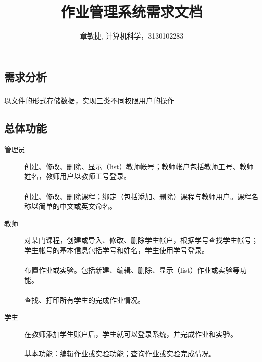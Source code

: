 \documentclass[notitlepage,cs4size,punct,oneside]{report}
\begin{document}
\begin{CJK}{UTF8}{hei} %


\renewcommand{\abstractname}{摘 \qquad 要}
\renewcommand{\contentsname}{\center 目\qquad\qquad 录}
\renewcommand{\listfigurename}{图 \quad 示 \quad 目 \quad 录}
\renewcommand{\listtablename}{表 \quad 格 \quad 目 \quad 录}
\renewcommand{\appendixname}{附录}
\renewcommand{\chaptername}{章节}
\renewcommand{\indexname}{\center 索 \qquad 引}
\renewcommand{\figurename}{图}
\renewcommand{\tablename}{表}

\newcommand{\upcite}[1]{\textsuperscript{\cite{#1}}}


\title{作业管理系统需求文档}
\author{章敏捷, 计算机科学，3130102283}

\maketitle
\tableofcontents
\pagebreak

\chapter{需求分析}
\paragraph{}以文件的形式存储数据，实现三类不同权限用户的操作
\section{总体功能}
\begin{description}
  \item[管理员] 创建、修改、删除、显示（list）教师帐号；教师帐户包括教师工号、教师姓名，教师用户以教师工号登录。\\ \\
 创建、修改、删除课程；绑定（包括添加、删除）课程与教师用户。课程名称以简单的中文或英文命名。
  \item[教师 ] 对某门课程，创建或导入、修改、删除学生帐户，根据学号查找学生帐号；学生帐号的基本信息包括学号和姓名，学生使用学号登录。\\ \\
  布置作业或实验。包括新建、编辑、删除、显示（list）作业或实验等功能。\\ \\
  查找、打印所有学生的完成作业情况。
  \item[学生 ] 在教师添加学生账户后，学生就可以登录系统，并完成作业和实验。\\ \\
  基本功能：编辑作业或实验功能；查询作业或实验完成情况。
\end{description}

\end{CJK}
\end{document}
